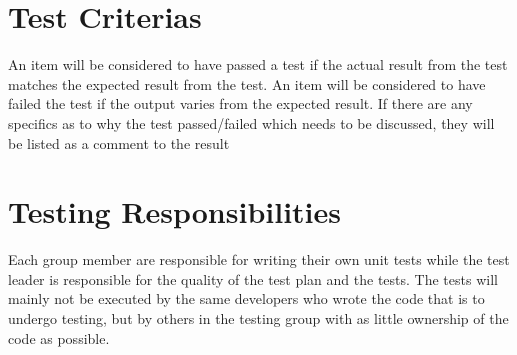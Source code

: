 \section{Test Criterias}
An item will be considered to have passed a test if the actual result from the test matches the expected result from the test. An item will be considered to have failed the test if the output varies from the expected result. If there are any specifics as to why the test passed/failed which needs to be discussed, they will be listed as a comment to the result


\section{Testing Responsibilities}
Each group member are responsible for writing their own unit tests while the test leader is responsible for the quality of the test plan and the tests. The tests will mainly not be executed by the same developers who wrote the code that is to undergo testing, but by others in the testing group with as little ownership of the code as possible. 

